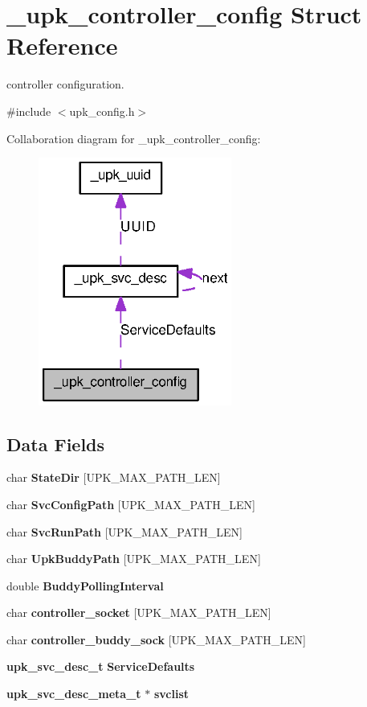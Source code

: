 \section{\_\-upk\_\-controller\_\-config Struct Reference}
\label{struct__upk__controller__config}


controller configuration.  




{\ttfamily \#include $<$upk\_\-config.h$>$}



Collaboration diagram for \_\-upk\_\-controller\_\-config:\nopagebreak
\begin{figure}[H]
\begin{center}
\leavevmode
\includegraphics[width=180pt]{struct__upk__controller__config__coll__graph}
\end{center}
\end{figure}
\subsection*{Data Fields}
\begin{DoxyCompactItemize}
\item 
char {\bf StateDir} [UPK\_\-MAX\_\-PATH\_\-LEN]
\item 
char {\bf SvcConfigPath} [UPK\_\-MAX\_\-PATH\_\-LEN]
\item 
char {\bf SvcRunPath} [UPK\_\-MAX\_\-PATH\_\-LEN]
\item 
char {\bf UpkBuddyPath} [UPK\_\-MAX\_\-PATH\_\-LEN]
\item 
double {\bf BuddyPollingInterval}
\item 
char {\bf controller\_\-socket} [UPK\_\-MAX\_\-PATH\_\-LEN]
\item 
char {\bf controller\_\-buddy\_\-sock} [UPK\_\-MAX\_\-PATH\_\-LEN]
\item 
{\bf upk\_\-svc\_\-desc\_\-t} {\bf ServiceDefaults}
\item 
{\bf upk\_\-svc\_\-desc\_\-meta\_\-t} $\ast$ {\bf svclist}
\end{DoxyCompactItemize}


